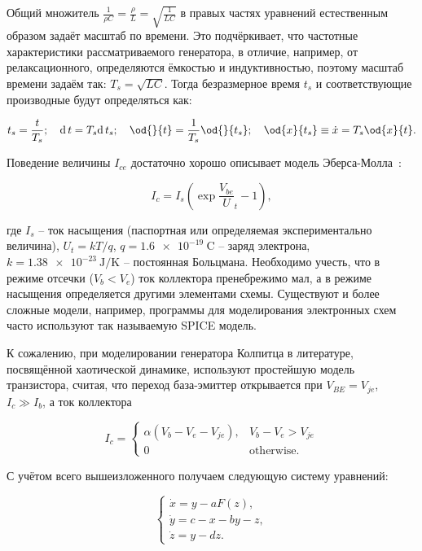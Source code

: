 Общий множитель $ \frac{1}{\rho C} = \frac{\rho}{L} = \sqrt{\frac{1}{LC}} $ в правых частях уравнений
естественным образом задаёт масштаб по времени.
Это подчёркивает, что частотные характеристики рассматриваемого генератора,
в отличие, например, от релаксационного,
определяются ёмкостью и индуктивностью,
поэтому масштаб времени задаём так:
$ T_s = \sqrt{L C} $.
Тогда безразмерное время $t_s$
и соответствующие производные
будут определяться как:

\[
  t_s = \frac{t}{T_s}; \quad
  \mathrm{d}\, t = T_s \mathrm{d}\, t_s; \quad
  \od{}{t}  = \frac{1}{T_s} \od{}{t_s}; \quad
  \od{x}{t_s} \equiv \dot{x} = T_s \od{x}{t} .
\]

Поведение величины $I_{ce}$ достаточно хорошо описывает модель
Эберса-Молла~\cite{horowitz}:

\begin{equation}
  I_c = I_s \left( \exp\frac{V_{be}}U_t{} - 1 \right),
  \label{atu:eq:ebers-moll}
\end{equation}

\noindent
где
$I_s$ -- ток насыщения (паспортная или определяемая экспериментально величина),
$U_t=kT/q$,
$q = \SI{1.6e-19}{\coulomb}$ -- заряд электрона,
$k = \SI{1.38e-23}{\joule/\kelvin}$ -- постоянная Больцмана.
Необходимо учесть, что в режиме отсечки ($V_b < V_e$) ток коллектора пренебрежимо мал,
а в режиме насыщения определяется другими элементами схемы.
Существуют и более сложные модели, например,
программы для моделирования электронных схем часто используют так называемую SPICE модель.

К сожалению, при моделировании генератора Колпитца в литературе,
посвящённой хаотической динамике, используют
простейшую модель транзистора, считая, что переход
база-эмиттер открывается при $V_{BE} = V_{je}$, $ I_c \gg I_b$,
а ток коллектора

\begin{equation}
I_c =
  \begin{cases}
    \alpha ( V_b - V_e - V_{je} ), & V_b - V_e > V_{je} \\
    0                              & \text{otherwise}.
  \end{cases}
  \label{atu:eq:bjt_libear_model}
\end{equation}



С учётом всего вышеизложенного получаем следующую систему уравнений:

\begin{equation}
\label{atu:eq:colp}
\begin{cases}
  \dot{x} = y - a F(z), \\
  \dot{y} = c - x - by - z, \\
  \dot{z} = y - d z.
\end{cases}
\end{equation}

